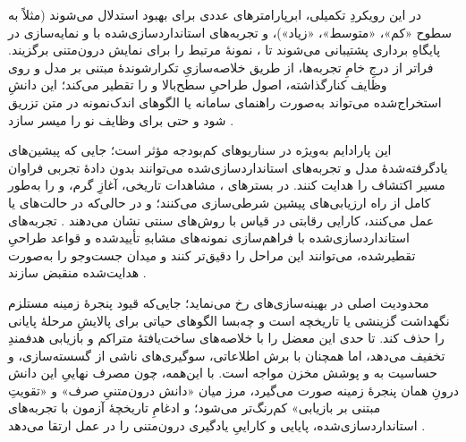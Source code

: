 در این رویکردِ تکمیلی، ابرپارامترهای عددی برای بهبود استدلال  می‌شوند (مثلاً به سطوح «کم»، «متوسط»، «زیاد»)، و تجربه‌های استانداردسازی‌شده با  و نمایه‌سازی در پایگاهِ برداری پشتیبانی می‌شوند تا ،  نمونهٔ مرتبط را برای نمایش درون‌متنی برگزیند. فراتر از درجِ خامِ تجربه‌ها،  از طریق خلاصه‌سازیِ تکرارشوندهٔ مبتنی بر مدل و  روی وظایف کنارگذاشته، اصول طراحیِ سطح‌بالا و  را تقطیر می‌کند؛ این دانشِ استخراج‌شده می‌تواند به‌صورت راهنمای سامانه یا الگوهای اندک‌نمونه در متن تزریق شود و حتی  برای وظایف نو را میسر سازد \cite{zhang-etal-2024-MLCopilot}.

این پارادایم به‌ویژه در سناریوهای کم‌بودجه مؤثر است؛ جایی که پیشین‌های یادگرفته‌شدهٔ مدل و تجربه‌های استانداردسازی‌شده می‌توانند بدون دادهٔ تجربی فراوان مسیر اکتشاف را هدایت کنند. در بسترهای ، مشاهدات تاریخی، آغازِ گرم،  و  را به‌طور کامل از راه  ارزیابی‌های پیشین شرطی‌سازی می‌کنند؛ و در حالی‌که در حالت‌های  یا  عمل می‌کنند، کارایی رقابتی در قیاس با روش‌های سنتی نشان می‌دهند \cite{liu2024LLAMBO}. تجربه‌های استانداردسازی‌شده با فراهم‌سازی نمونه‌های مشابهِ تأییدشده و قواعد طراحیِ تقطیرشده، می‌توانند این مراحل را دقیق‌تر  کنند و میدان جست‌وجو را به‌صورت هدایت‌شده منقبض سازند \cite{zhang-etal-2024-MLCopilot}.

محدودیت اصلی در بهینه‌سازی‌های  رخ می‌نماید؛ جایی‌که قیود پنجرهٔ زمینه مستلزم نگهداشت گزینشی یا  تاریخچه است و چه‌بسا الگوهای حیاتی برای پالایشِ مرحلهٔ پایانی را حذف کند.  تا حدی این معضل را با خلاصه‌های ساخت‌یافتهٔ متراکم و بازیابی هدفمندِ  تخفیف می‌دهد، اما همچنان با برش اطلاعاتی، سوگیری‌های ناشی از گسسته‌سازی، و حساسیت به  و پوشش مخزن مواجه است. با این‌همه، چون مصرف نهاییِ این دانش درونِ همان پنجرهٔ زمینه صورت می‌گیرد، مرز میان «دانش درون‌متنیِ صرف» و «تقویتِ مبتنی بر بازیابی» کم‌رنگ‌تر می‌شود؛ و ادغامِ تاریخچهٔ آزمون با تجربه‌های استانداردسازی‌شده، پایایی و کاراییِ یادگیری درون‌متنی را در عمل ارتقا می‌دهد \cite{zhang2023usingLLMforHPO, zheng2023GENIUS, chen2023Evoprompting, liu2024LLAMBO, zhang-etal-2024-MLCopilot}.

